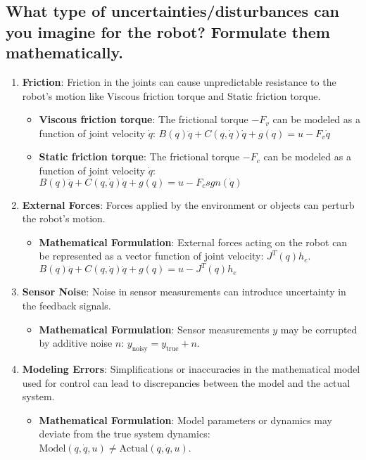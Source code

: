 \documentclass[a4paper, 12pt]{report}
\begin{document}
\subsection{What type of uncertainties/disturbances can you imagine for the robot? Formulate them mathematically.}
\begin{enumerate}
    \item \textbf{Friction}: Friction in the joints can cause unpredictable resistance to the robot's motion like Viscous friction torque and Static friction torque.
    \begin{itemize}
        \item \textbf{Viscous friction torque}: The frictional torque $-F_v$ can be modeled as a function of joint velocity $\dot{q}$: $B(q)\ddot{q} + C(q, \dot{q})\dot{q} + g(q) = u - F_v \dot{q}$
        \item \textbf{Static friction torque}: The frictional torque $-F_c$ can be modeled as a function of joint velocity $\dot{q}$: $B(q)\ddot{q} + C(q, \dot{q})\dot{q} + g(q) = u - F_c sgn(\dot{q})$
    \end{itemize}
    
    \item \textbf{External Forces}: Forces applied by the environment or objects can perturb the robot's motion.
    \begin{itemize}
        \item \textbf{Mathematical Formulation}: External forces acting on the robot can be represented as a vector function of joint velocity: $J^T(q) h_e$.
        $B(q)\ddot{q} + C(q, \dot{q})\dot{q} + g(q) = u - J^T(q) h_e$
    \end{itemize}
    
    \item \textbf{Sensor Noise}: Noise in sensor measurements can introduce uncertainty in the feedback signals.
    \begin{itemize}
        \item \textbf{Mathematical Formulation}: Sensor measurements $y$ may be corrupted by additive noise $n$: $y_{\text{noisy}} = y_{\text{true}} + n$.
    \end{itemize}
    
    \item \textbf{Modeling Errors}: Simplifications or inaccuracies in the mathematical model used for control can lead to discrepancies between the model and the actual system.
    \begin{itemize}
        \item \textbf{Mathematical Formulation}: Model parameters or dynamics may deviate from the true system dynamics: $\text{Model}(q, \dot{q}, u) \neq \text{Actual}(q, \dot{q}, u)$.
    \end{itemize}
\end{enumerate}
\end{document}
